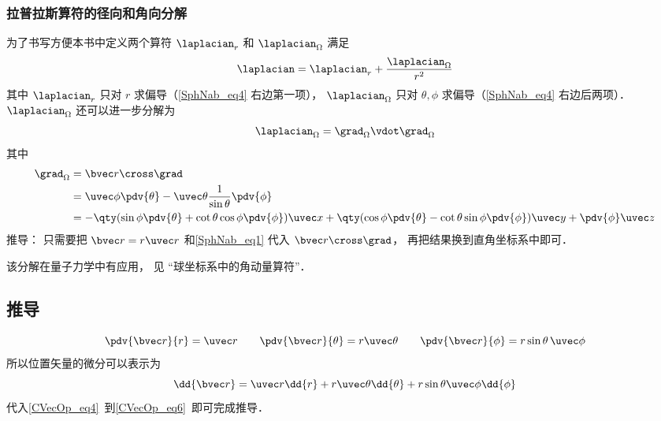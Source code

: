 \subsubsection{拉普拉斯算符的径向和角向分解}
为了书写方便本书中定义两个算符 $\laplacian_r$ 和 $\laplacian_\Omega$ 满足
\begin{equation}\label{SphNab_eq3}
\laplacian = \laplacian_r + \frac{\laplacian_\Omega}{r^2}
\end{equation}
其中 $\laplacian_r$ 只对 $r$ 求偏导（\autoref{SphNab_eq4} 右边第一项）， $\laplacian_\Omega$ 只对 $\theta,\phi$ 求偏导（\autoref{SphNab_eq4} 右边后两项）． $\laplacian_\Omega$ 还可以进一步分解为
\begin{equation}
\laplacian_\Omega = \grad_\Omega\vdot \grad_\Omega
\end{equation}
其中
\begin{equation}
\begin{aligned}
\grad_\Omega &= \bvec r \cross \grad\\
&= \uvec \phi \pdv{\theta} - \uvec \theta\frac{1}{\sin\theta} \pdv{\phi}\\
&= -\qty(\sin\phi\pdv{\theta} + \cot\theta\cos\phi\pdv{\phi})\uvec x
+ \qty(\cos\phi\pdv{\theta} - \cot\theta \sin\phi \pdv{\phi}) \uvec y
+ \pdv{\phi} \uvec z
\end{aligned}
\end{equation}
推导： 只需要把 $\bvec r = r \uvec r$ 和\autoref{SphNab_eq1} 代入 $\bvec r \cross \grad$， 再把结果换到直角坐标系中即可．

该分解在量子力学中有应用， 见 “球坐标系中的角动量算符”．

\subsection{推导}
\begin{equation}\label{SphNab_eq11}
\pdv{\bvec r}{r} = \uvec r \qquad
\pdv{\bvec r}{\theta} = r\uvec \theta \qquad
\pdv{\bvec r}{\phi} = r\sin\theta\,\uvec\phi
\end{equation}
所以位置矢量的微分可以表示为
\begin{equation}\label{SphNab_eq12}
\dd{\bvec r} = \uvec r \dd{r} + r\uvec \theta\dd{\theta} + r\sin\theta\uvec \phi\dd{\phi}
\end{equation}
代入\autoref{CVecOp_eq4}~到\autoref{CVecOp_eq6}~即可完成推导．
